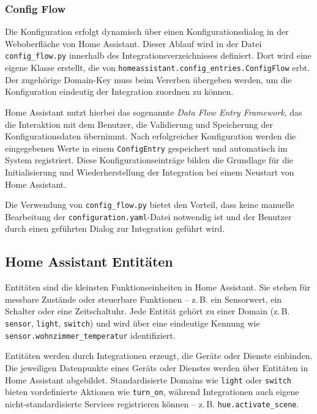 \subsubsection{Config Flow}

Die Konfiguration erfolgt dynamisch über einen Konfigurationsdialog in der Weboberfläche von Home Assistant. Dieser Ablauf wird in der Datei \texttt{config\_flow.py} innerhalb des Integrationsverzeichnisses definiert. Dort wird eine eigene Klasse erstellt, die von \texttt{homeassistant.config\_entries.ConfigFlow} erbt. Der zugehörige Domain-Key muss beim Vererben übergeben werden, um die Konfiguration eindeutig der Integration zuordnen zu können.

Home Assistant nutzt hierbei das sogenannte \textit{Data Flow Entry Framework}, das die Interaktion mit dem Benutzer, die Validierung und Speicherung der Konfigurationsdaten übernimmt. Nach erfolgreicher Konfiguration werden die eingegebenen Werte in einem \texttt{ConfigEntry} gespeichert und automatisch im System registriert. Diese Konfigurationseinträge bilden die Grundlage für die Initialisierung und Wiederherstellung der Integration bei einem Neustart von Home Assistant.

Die Verwendung von \texttt{config\_flow.py} bietet den Vorteil, dass keine manuelle Bearbeitung der \texttt{configuration.yaml}-Datei notwendig ist und der Benutzer durch einen geführten Dialog zur Integration geführt wird.


\subsection{Home Assistant Entitäten}

Entitäten sind die kleinsten Funktionseinheiten in Home Assistant. Sie stehen für messbare Zustände oder steuerbare Funktionen – z.\,B. ein Sensorwert, ein Schalter oder eine Zeitschaltuhr. Jede Entität gehört zu einer Domain (z.\,B. \texttt{sensor}, \texttt{light}, \texttt{switch}) und wird über eine eindeutige Kennung wie \texttt{sensor.wohnzimmer\_temperatur} identifiziert.

Entitäten werden durch Integrationen erzeugt, die Geräte oder Dienste einbinden. Die jeweiligen Datenpunkte eines Geräts oder Dienstes werden über Entitäten in Home Assistant abgebildet. Standardisierte Domains wie \texttt{light} oder \texttt{switch} bieten vordefinierte Aktionen wie \texttt{turn\_on}, während Integrationen auch eigene nicht-standardisierte Services registrieren können – z.\,B. \texttt{hue.activate\_scene}.

